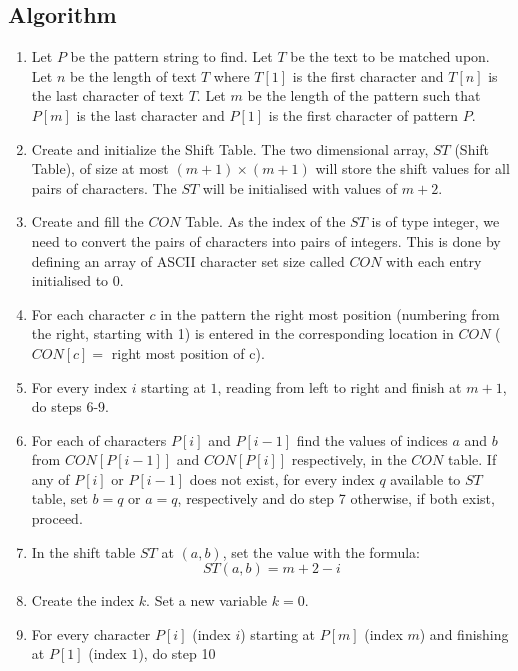 \subsection{Algorithm}
\begin{enumerate}
\item Let $P$ be the pattern string to find. Let $T$ be the text to be matched upon. Let $n$ be the length of text $T$ where $T[1]$ is the first character and $T[n]$ is the last character of text $T$. Let $m$ be the length of the pattern such that $P[m]$ is the last character and $P[1]$ is the first character of pattern $P$.

\item Create and initialize the Shift Table. The two dimensional array, $ST$ (Shift Table), of size at most $(m+1)\times(m+1)$ will store the shift values for all pairs of characters. The $ST$ will be initialised with values of $m+2$.

\item Create and fill the $CON$ Table. As the index of the $ST$ is of type integer, we need to convert the pairs of characters into pairs of integers. This is done by defining an array of ASCII character set size called $CON$ with each entry initialised to $0$.

\item For each character $c$ in the pattern the right most position (numbering from the right, starting with 1) is entered in the corresponding location in $CON$ ($CON[c]=$ right most position of c).

\item For every index $i$ starting at $1$, reading from left to right and finish at $m+1$, do steps 6-9.

	\item For each of characters $P[i]$ and $P[i-1]$ find the values of indices $a$ and $b$ from $CON[P[i-1]]$ and $CON[P[i]]$ respectively, in the $CON$ table. If any of $P[i]$ or $P[i-1]$ does not exist, for every index $q$ available to $ST$ table, set $b=q$ or $a=q$, respectively and do step 7 otherwise, if both exist, proceed.

	\item In the shift table $ST$ at $(a, b)$, set the value with the formula: $$ ST(a,b) = m+2-i $$

\item Create the index $k$. Set a new variable $k=0$.

\item For every character $P[i]$ (index $i$) starting at $P[m]$ (index $m$) and finishing at $P[1]$ (index $1$), do step 10 
	

\end{enumerate}
